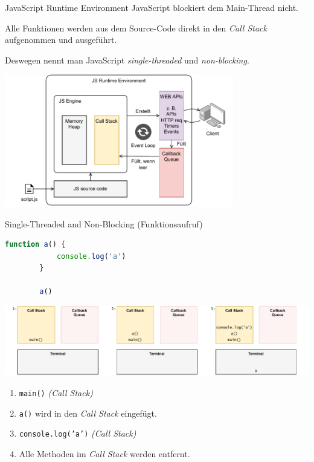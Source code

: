 \begin{defi}{JavaScript Runtime Environment}
    JavaScript blockiert dem Main-Thread nicht.

    Alle Funktionen werden aus dem Source-Code direkt in den \emph{Call Stack} aufgenommen und ausgeführt.

    Deswegen nennt man JavaScript \emph{single-threaded} und \emph{non-blocking}.

    \begin{center}
        \includegraphics[width=0.75\textwidth]{includes/figures/defi_js_runtime_environment.pdf}
    \end{center}
\end{defi}

\begin{example}{Single-Threaded and Non-Blocking (Funktionsaufruf)}
    \begin{lstlisting}[language=JavaScript]
        function a() {
            console.log('a')            
        }

        a()
    \end{lstlisting}

    \includegraphics[width=\textwidth]{includes/figures/example_stanb_1.pdf}

    \begin{enumerate}
        \item \texttt{main()} \emph{(Call Stack)}
        \item \texttt{a()} wird in den \emph{Call Stack} eingefügt.
        \item \texttt{console.log('a')} \emph{(Call Stack)}
        \item Alle Methoden im \emph{Call Stack} werden entfernt.
    \end{enumerate}
\end{example}

